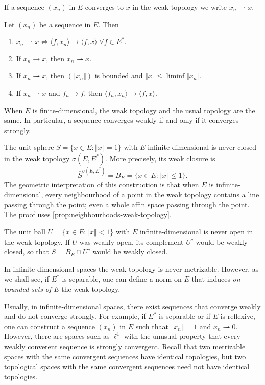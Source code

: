 \documentclass{article}
\theoremstyle{definition}
\numberwithin{equation}{section}
\begin{document}
If a sequence $(x_n)$ in $E$ converges to $x$ in the weak topology we write $x_n\rightharpoonup x$.
\begin{prop}
	Let $(x_n)$ be a sequence in $E$. Then
	\begin{enumerate}
		\item $x_n\rightharpoonup x \iff \langle f,x_n\rangle\to\langle f,x\rangle\;\forall f\in E^*$.
		\item If $x_n\to x$, then $x_n\rightharpoonup x$.
		\item If $x_n\rightharpoonup x$, then $(\Vert x_n\Vert)$ is bounded and $\Vert x\Vert\leq \liminf\Vert x_n\Vert$.
		\item If $x_n\rightharpoonup x$ and $f_n\to f$, then $\langle f_n,x_n\rangle\to\langle f,x\rangle$.
	\end{enumerate}
\end{prop}
\begin{prop}
	When $E$ is finite-dimensional, the weak topology and the usual topology are the same. In particular, a sequence converges weakly if and only if it converges strongly.
\end{prop}
\begin{example}
	The unit sphere $S=\{x\in E:\Vert x\Vert=1\}$ with $E$ infinite-dimensional is never closed in the weak topology $\sigma (E,E^*)$. More precisely, its weak closure is
	\[\overline{S}^{\sigma(E,E^*)}=B_E=\{x\in E:\Vert x\Vert\leq1\}.\]
	The geometric interpretation of this construction is that when $E$ is infinite-dimensional, every neighbourhood of a point in the weak topology contains a line passing through the point; even a whole affin space passing through the point. The proof uses \cref{prop:neighbourhoods-weak-topology}.
\end{example}
\begin{example}
	The unit ball $U=\{x\in E:\Vert x\Vert<1\}$ with $E$ infinite-dimensional is never open in the weak topology. If $U$ was weakly open, its complement $U^c$ would be weakly closed, so that $S=B_E\cap U^c$ would be weakly closed.
\end{example}
\begin{remark}
	In infinite-dimensional spaces the weak topology is never metrizable. However, as we shall see, if $E^*$ is separable, one can define a norm on $E$ that induces \textit{on bounded sets of $E$} the weak topology.
\end{remark}
\begin{remark}
	Usually, in infinite-dimensional spaces, there exist sequences that converge weakly and do not converge strongly. For example, if $E^*$ is separable or if $E$ is reflexive, one can construct a sequence $(x_n)$ in $E$ such thaat $\Vert x_n\Vert =1$ and $x_n\rightharpoonup0$. However, there are spaces such as $\ell^1$ with the unusual property that every weakly converent sequence is strongly convergent. Recall that two metrizable spaces with the same convergent sequences have identical topologies, but two topological spaces with the same convergent sequences need not have identical topologies.
\end{remark}
\end{document}
